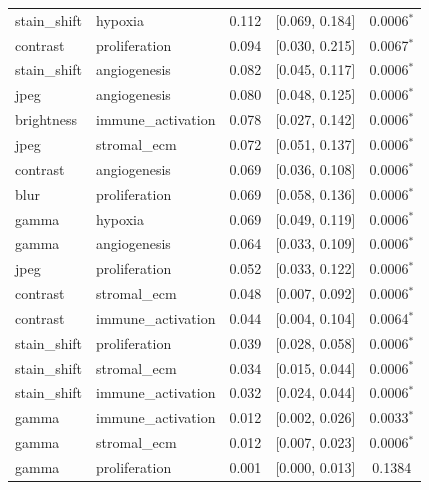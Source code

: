 \begin{table}[t]
\begin{tabular}{llccc}
stain\_shift & hypoxia & 0.112 & [0.069, 0.184] & 0.0006$^{*}$ \\
contrast & proliferation & 0.094 & [0.030, 0.215] & 0.0067$^{*}$ \\
stain\_shift & angiogenesis & 0.082 & [0.045, 0.117] & 0.0006$^{*}$ \\
jpeg & angiogenesis & 0.080 & [0.048, 0.125] & 0.0006$^{*}$ \\
brightness & immune\_activation & 0.078 & [0.027, 0.142] & 0.0006$^{*}$ \\
jpeg & stromal\_ecm & 0.072 & [0.051, 0.137] & 0.0006$^{*}$ \\
contrast & angiogenesis & 0.069 & [0.036, 0.108] & 0.0006$^{*}$ \\
blur & proliferation & 0.069 & [0.058, 0.136] & 0.0006$^{*}$ \\
gamma & hypoxia & 0.069 & [0.049, 0.119] & 0.0006$^{*}$ \\
gamma & angiogenesis & 0.064 & [0.033, 0.109] & 0.0006$^{*}$ \\
jpeg & proliferation & 0.052 & [0.033, 0.122] & 0.0006$^{*}$ \\
contrast & stromal\_ecm & 0.048 & [0.007, 0.092] & 0.0006$^{*}$ \\
contrast & immune\_activation & 0.044 & [0.004, 0.104] & 0.0064$^{*}$ \\
stain\_shift & proliferation & 0.039 & [0.028, 0.058] & 0.0006$^{*}$ \\
stain\_shift & stromal\_ecm & 0.034 & [0.015, 0.044] & 0.0006$^{*}$ \\
stain\_shift & immune\_activation & 0.032 & [0.024, 0.044] & 0.0006$^{*}$ \\
gamma & immune\_activation & 0.012 & [0.002, 0.026] & 0.0033$^{*}$ \\
gamma & stromal\_ecm & 0.012 & [0.007, 0.023] & 0.0006$^{*}$ \\
gamma & proliferation & 0.001 & [0.000, 0.013] & 0.1384 \\
\bottomrule
\end{tabular}
\end{table}
